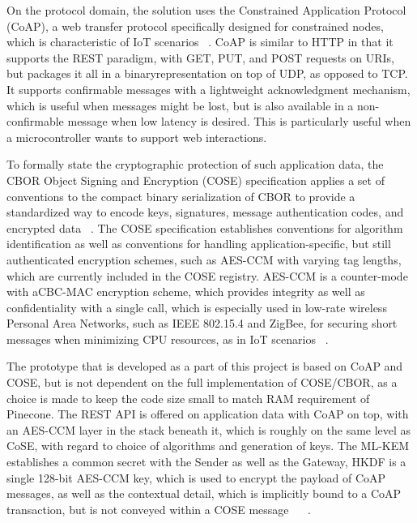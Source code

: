 \documentclass[USenglish,oneside,twocolumn]{article}
\begin{document}
    On the protocol domain, the solution uses the Constrained Application Protocol (CoAP), a web transfer protocol specifically designed for constrained nodes, which is characteristic of IoT scenarios ~\cite{shelby2014}. CoAP is similar to HTTP in that it supports the REST paradigm, with GET, PUT, and POST requests on URIs, but packages it all in a binaryrepresentation on top of UDP, as opposed to TCP. It supports confirmable messages with a lightweight acknowledgment mechanism, which is useful when messages might be lost, but is also available in a non-confirmable message when low latency is desired. This is particularly useful when a microcontroller wants to support web interactions. ~\cite{shelby2014}

    To formally state the cryptographic protection of such application data, the CBOR Object Signing and Encryption (COSE) specification applies a set of conventions to the compact binary serialization of CBOR to provide a standardized way to encode keys, signatures, message authentication codes, and encrypted data ~\cite{schaad2022}. The COSE specification establishes conventions for algorithm identification as well as conventions for handling application-specific, but still authenticated encryption schemes, such as AES-CCM with varying tag lengths, which are currently included in the COSE registry. AES-CCM is a counter-mode with aCBC-MAC encryption scheme, which provides integrity as well as confidentiality with a single call, which is especially used in low-rate wireless Personal Area Networks, such as IEEE 802.15.4 and ZigBee, for securing short messages when minimizing CPU resources, as in IoT scenarios ~\cite{Naveen2024}.

    The prototype that is developed as a part of this project is based on CoAP and COSE, but is not dependent on the full implementation of COSE/CBOR, as a choice is made to keep the code size small to match RAM requirement of Pinecone. The REST API is offered on application data with CoAP on top, with an AES-CCM layer in the stack beneath it, which is roughly on the same level as CoSE, with regard to choice of algorithms and generation of keys. The ML-KEM establishes a common secret with the Sender as well as the Gateway, HKDF is a single 128-bit AES-CCM key, which is used to encrypt the payload of CoAP messages, as well as the contextual detail, which is implicitly bound to a CoAP transaction, but is not conveyed within a COSE message ~\cite{shelby2014} ~\cite{schaad2022}.
\end{document}
